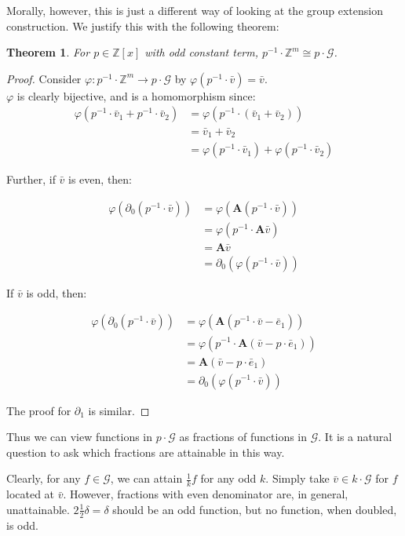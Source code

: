 \documentclass{article}
\newcommand{\G}{\mathcal{G}}
\newcommand{\Z}{\mathbb{Z}}
\newcommand{\2}{\textbf{2}}
\newcommand{\Am}{\textbf{A}}
\newcommand{\del}{\partial}
\newcommand{\vv}{\bar{v}}
\newcommand{\e}{\bar{e}}
\newtheorem{thm}{Theorem}
\theoremstyle{definition}
\begin{document}
Morally, however, this is just a different way of looking at the group 
extension construction. We justify this with the following theorem:

\begin{thm}
  For $p \in \Z[x]$ with odd constant term, 
  $p^{-1} \cdot \Z^m \cong p \cdot \G$.
\end{thm}

\begin{proof}
  Consider $\varphi : p^{-1} \cdot \Z^m \to p \cdot \G$ by
  $\varphi(p^{-1} \cdot \vv) = \vv$.\\
  $\varphi$ is clearly bijective, and is a homomorphism since:
  \begin{align*}
       \varphi(p^{-1} \cdot \vv_1 + p^{-1} \cdot \vv_2) 
    &= \varphi(p^{-1} \cdot (\vv_1 + \vv_2))\\
    &= \vv_1 + \vv_2\\
    &= \varphi(p^{-1} \cdot \vv_1) + \varphi(p^{-1} \cdot \vv_2) 
  \end{align*}

  Further, if $\vv$ is even, then:

  \begin{align*}
       \varphi(\del_0 (p^{-1} \cdot \vv))
    &= \varphi(\Am (p^{-1} \cdot \vv))\\
    &= \varphi(p^{-1} \cdot \Am \vv)\\
    &= \Am \vv\\
    &= \del_0 (\varphi(p^{-1} \cdot \vv))
  \end{align*}

  If $\vv$ is odd, then: 

  \begin{align*}
       \varphi(\del_0 (p^{-1} \cdot \vv))
    &= \varphi(\Am (p^{-1} \cdot \vv - \e_1))\\
    &= \varphi(p^{-1} \cdot \Am (\vv - p \cdot \e_1))\\
    &= \Am (\vv - p \cdot \e_1)\\
    &= \del_0 (\varphi(p^{-1} \cdot \vv))
  \end{align*}

  The proof for $\del_1$ is similar.
\end{proof}

Thus we can view functions in $p \cdot \G$ as fractions of functions in $\G$.
It is a natural question to ask which fractions are attainable in this way.

Clearly, for any $f \in \G$, we can attain $\frac{1}{k} f$ for any odd $k$.
Simply take $\vv \in k \cdot \G$ for $f$ located at $\vv$.
However, fractions with even denominator are, in general, unattainable.
$2 \frac{1}{2}\delta = \delta$ should be an odd function,
but no function, when doubled, is odd.
\end{document}
